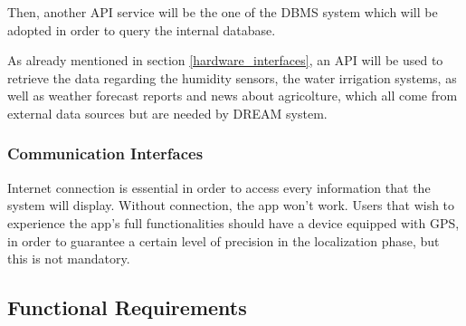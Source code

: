 \documentclass[table, 12pt]{article}
\begin{document}
Then, another API service will be the one of the DBMS system which will be adopted in order to query the internal database.

As already mentioned in section \ref{hardware_interfaces}, an API will be used to retrieve the data regarding the humidity sensors, the water irrigation systems, as well as weather forecast reports and news about agricolture, which all come from external data sources but are needed by DREAM system.

\subsubsection{Communication Interfaces}
Internet connection is essential in order to access every information that the system will display. Without connection, the app won't work.
Users that wish to experience the app's full functionalities should have a device equipped with GPS, in order to guarantee a certain level of precision in the localization phase, but this is not mandatory.

\subsection{Functional Requirements}
\end{document}
